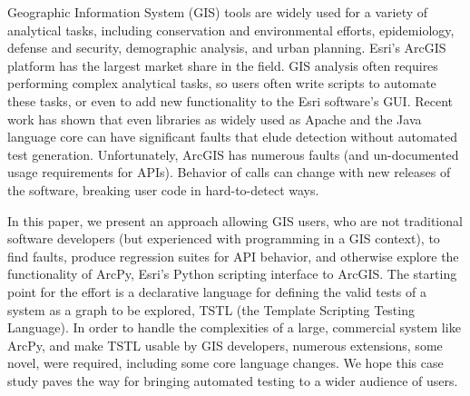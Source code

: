 Geographic Information System (GIS) tools are widely used for a variety of
analytical tasks, including conservation and environmental efforts,
epidemiology, defense and security, demographic analysis, and urban
planning.  Esri's ArcGIS platform has the largest market share in the
field.  GIS analysis often requires performing complex analytical
tasks, so users often write scripts to automate these tasks, or even
to add new functionality to the Esri software's GUI.  Recent work
has shown that even libraries as widely used as Apache and the Java
language core can have significant faults that elude detection without
automated test generation.  Unfortunately,  
ArcGIS has numerous faults (and un-documented usage requirements for
APIs).  Behavior of calls can change with new releases of the
software, breaking user code in hard-to-detect ways.

In this paper, we present an approach allowing GIS users, who are not
traditional software developers (but experienced with programming in a
GIS context), to find faults, produce regression suites for API
behavior, and otherwise explore the functionality of ArcPy, Esri's
Python scripting interface to ArcGIS.  The starting point for the
effort is a declarative language for defining the valid tests of a
system as a graph to be explored, TSTL (the Template Scripting Testing
Language).  In order to handle the complexities of a large, commercial
system like ArcPy, and make TSTL usable by GIS developers, numerous
extensions, some novel, were required, including some core language
changes.  We hope this case study paves the way for bringing automated
testing to a wider audience of users.
